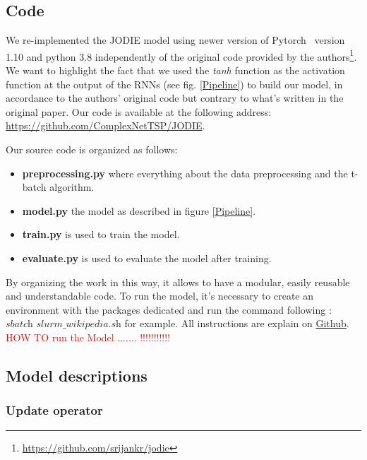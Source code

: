 
\subsection*{Code}
We re-implemented the JODIE model using newer version of Pytorch~\cite{NEURIPS2019_bdbca288} version 1.10 and python 3.8 independently of the original code provided by the authors\footnote{\url{https://github.com/srijankr/jodie}}. We want to highlight the fact that we used the \textit{tanh} function  as the activation function at the output of the RNNs (see fig. \ref{Pipeline}) to build our model,  in accordance to the authors' original code but contrary to what's written in the original paper. Our code is available at the following address: \url{https://github.com/ComplexNetTSP/JODIE}. 

Our source code is organized as follows:
\begin{itemize}
    \item \textbf{preprocessing.py} where everything about the data preprocessing and the t-batch algorithm.
    \item \textbf{model.py} the model as described in figure \ref{Pipeline}.
    \item \textbf{train.py} is used to train the model.
    \item \textbf{evaluate.py} is used to evaluate the model after training.
\end{itemize}
By organizing the work in this way, it allows to have a modular, easily reusable and understandable code. 
To run the model, it's necessary to create an environment with the packages dedicated and run the command following : $\textit{sbatch slurm\_wikipedia.sh}$ for example. All instructions are explain on \href{https://github.com/ComplexNetTSP/JODIE}{Github}.
\textcolor{red}{HOW TO run the Model ....... !!!!!!!!!!!}
\subsection*{Model descriptions}

\subsubsection{Update operator}

